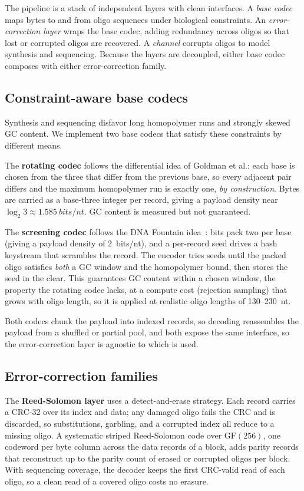 \documentclass[11pt]{article}
\begin{document}
The pipeline is a stack of independent layers with clean interfaces. A \emph{base codec}
maps bytes to and from oligo sequences under biological constraints. An
\emph{error-correction layer} wraps the base codec, adding redundancy across oligos so
that lost or corrupted oligos are recovered. A \emph{channel} corrupts oligos to model
synthesis and sequencing. Because the layers are decoupled, either base codec composes
with either error-correction family.

\subsection{Constraint-aware base codecs}

Synthesis and sequencing disfavor long homopolymer runs and strongly skewed GC content.
We implement two base codecs that satisfy these constraints by different means.

The \textbf{rotating codec} follows the differential idea of Goldman et al.: each base is
chosen from the three that differ from the previous base, so every adjacent pair differs
and the maximum homopolymer run is exactly one, \emph{by construction}. Bytes are carried
as a base-three integer per record, giving a payload density near
$\log_2 3 \approx \num{1.585}~bits/nt$. GC content is measured but not guaranteed.

The \textbf{screening codec} follows the DNA Fountain idea~\cite{erlich2017}: bits pack two
per base (giving a payload density of \num{2}~bits/nt), and a per-record seed drives a hash
keystream that scrambles the record. The encoder tries seeds until the packed oligo
satisfies \emph{both} a GC window and the homopolymer bound, then stores the seed in the
clear. This guarantees GC content within a chosen window, the property the rotating codec
lacks, at a compute cost (rejection sampling) that grows with oligo length, so it is
applied at realistic oligo lengths of \numrange{130}{230}~nt.

Both codecs chunk the payload into indexed records, so decoding reassembles the payload
from a shuffled or partial pool, and both expose the same interface, so the
error-correction layer is agnostic to which is used.

\subsection{Error-correction families}

The \textbf{Reed-Solomon layer} uses a detect-and-erase strategy. Each record carries a
CRC-32 over its index and data; any damaged oligo fails the CRC and is discarded, so
substitutions, garbling, and a corrupted index all reduce to a missing oligo. A
systematic striped Reed-Solomon code over $\mathrm{GF}(256)$, one codeword per byte
column across the data records of a block, adds parity records that reconstruct up to the
parity count of erased or corrupted oligos per block. With sequencing coverage, the
decoder keeps the first CRC-valid read of each oligo, so a clean read of a covered oligo
costs no erasure.
\end{document}
